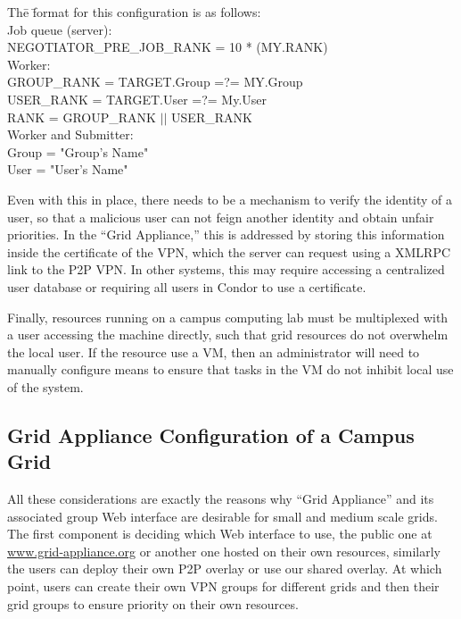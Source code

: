 \documentclass[conference]{IEEEtran}
\begin{document}
\begin{tabbing}
Th\=e \=format for this configuration is as follows:\\
\> Job queue (server):\\
\> \> NEGOTIATOR\_PRE\_JOB\_RANK = 10 * (MY.RANK) \\
\> Worker:\\
\> \> GROUP\_RANK = TARGET.Group =?= MY.Group \\
\> \> USER\_RANK = TARGET.User =?= My.User \\
\> \> RANK = GROUP\_RANK $\vert\vert$ USER\_RANK \\
\>  Worker and Submitter:\\
\> \> Group = "Group's Name"\\
\> \> User = "User's Name"
\end{tabbing}

Even with this in place, there needs to be a mechanism to verify the identity
of a user, so that a malicious user can not feign another identity and obtain
unfair priorities.  In the ``Grid Appliance,'' this is addressed by storing
this information inside the certificate of the VPN, which the server can
request using a XMLRPC link to the P2P VPN.  In other systems, this may require
accessing a centralized user database or requiring all users in Condor to use a
certificate.

Finally, resources running on a campus computing lab must be multiplexed with a
user accessing the machine directly, such that grid resources do not overwhelm
the local user.  If the resource use a VM, then an administrator will need to
manually configure means to ensure that tasks in the VM do not inhibit local
use of the system.

\subsection{Grid Appliance Configuration of a Campus Grid}

All these considerations are exactly the reasons why ``Grid Appliance'' and its
associated group Web interface are desirable for small and medium scale grids.
The first component is deciding which Web interface to use, the public one at
\url{www.grid-appliance.org} or another one hosted on their own resources,
similarly the users can deploy their own P2P overlay or use our shared overlay.
At which point, users can create their own VPN groups for different grids and
then their grid groups to ensure priority on their own resources.
\end{document}
